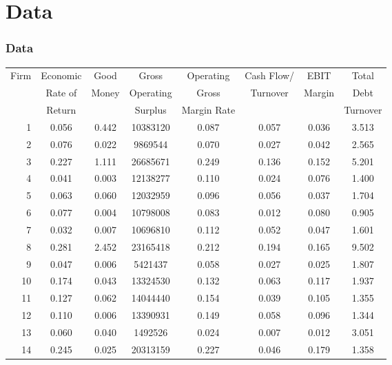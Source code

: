 \documentclass[12pt]{beamer}
\begin{document}
\section{Data}
\begin{frame}
\frametitle{Data}
\begin{center}
\renewcommand{\arraystretch}{1.1}
{\tiny
\begin{tabular}{|r|c|c|c|c|c|c|c|}
\hline
\multirow{3}{*}{Firm} & Economic & Good  & Gross & Operating & Cash Flow/ & EBIT & Total\\
 & Rate of & Money & Operating & Gross & Turnover & Margin & Debt\\
 & Return & & Surplus & Margin Rate & & & Turnover\\
\hline
1  & 0.056 & 0.442 & 10383120 & 0.087 & 0.057 & 0.036 & 3.513 \\ \hline
2  & 0.076 & 0.022 & 9869544  & 0.070 & 0.027 & 0.042 & 2.565 \\ \hline
3  & 0.227 & 1.111 & 26685671 & 0.249 & 0.136 & 0.152 & 5.201 \\ \hline
4  & 0.041 & 0.003 & 12138277 & 0.110 & 0.024 & 0.076 & 1.400 \\ \hline
5  & 0.063 & 0.060 & 12032959 & 0.096 & 0.056 & 0.037 & 1.704 \\ \hline
6  & 0.077 & 0.004 & 10798008 & 0.083 & 0.012 & 0.080 & 0.905 \\ \hline
7  & 0.032 & 0.007 & 10696810 & 0.112 & 0.052 & 0.047 & 1.601 \\ \hline
8  & 0.281 & 2.452 & 23165418 & 0.212 & 0.194 & 0.165 & 9.502 \\ \hline
9  & 0.047 & 0.006 & 5421437  & 0.058 & 0.027 & 0.025 & 1.807 \\ \hline
10 & 0.174 & 0.043 & 13324530 & 0.132 & 0.063 & 0.117 & 1.937 \\ \hline
11 & 0.127 & 0.062 & 14044440 & 0.154 & 0.039 & 0.105 & 1.355 \\ \hline
12 & 0.110 & 0.006 & 13390931 & 0.149 & 0.058 & 0.096 & 1.344 \\ \hline
13 & 0.060 & 0.040 & 1492526  & 0.024 & 0.007 & 0.012 & 3.051 \\ \hline
14 & 0.245 & 0.025 & 20313159 & 0.227 & 0.046 & 0.179 & 1.358 \\ \hline
\end{tabular}}
\end{center}
\end{frame}
\end{document}
